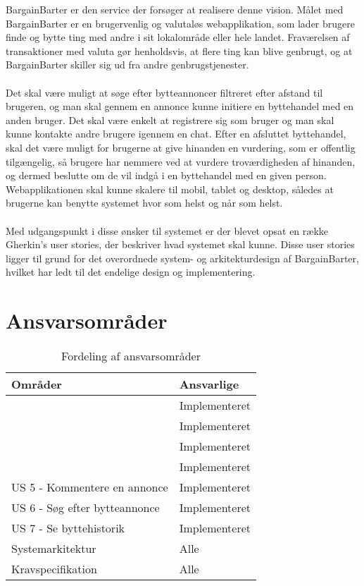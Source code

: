 BargainBarter er den service der forsøger at realisere denne vision. 
Målet med BargainBarter er en brugervenlig og valutaløs webapplikation, som lader brugere finde og bytte ting med andre i sit lokalområde eller hele landet. Fraværelsen af transaktioner med valuta gør henholdsvis, at flere ting kan blive genbrugt, og at BargainBarter skiller sig ud fra andre genbrugstjenester. \\ \\ \noindent
  Det skal være muligt at søge efter bytteannoncer filtreret efter afstand til brugeren, og man skal gennem en annonce kunne initiere en byttehandel med en anden bruger. Det skal være enkelt at registrere sig som bruger og man skal kunne kontakte andre brugere igennem en chat. Efter en afsluttet byttehandel, skal det være muligt for brugerne at give hinanden en vurdering, som er offentlig tilgængelig, så brugere har nemmere ved at vurdere troværdigheden af hinanden, og dermed beslutte om de vil indgå i en byttehandel med en given person. Webapplikationen skal kunne skalere til mobil, tablet og desktop, således at brugerne kan benytte systemet hvor som helst og når som helst.  \\ \\ \noindent
Med udgangspunkt i disse ønsker til systemet er der blevet opsat en række Gherkin's user stories, der beskriver hvad systemet skal kunne. Disse user stories ligger til grund for det overordnede system- og arkitekturdesign af BargainBarter, hvilket har ledt til det endelige design og implementering.  

\section{Ansvarsområder}
\begin{table}[H]
	\begin{tabular}{ | l | p{5cm} |}
		\hline
		\textbf{Områder}  & \textbf{Ansvarlige} \\ \hline
		  & Implementeret \\ \hline
		& Implementeret \\ \hline
		 & Implementeret \\ \hline
		 & Implementeret \\ \hline
		US 5 - Kommentere en annonce & Implementeret \\ \hline
		US 6 - Søg efter bytteannonce & Implementeret \\ \hline
		US 7 - Se byttehistorik & Implementeret \\ \hline	
		Systemarkitektur & Alle \\ \hline	
		Kravspecifikation & Alle \\ \hline	
	\end{tabular}
	\caption{Fordeling af ansvarsområder}
	\label{fig:Ansvarstabel}
\end{table}